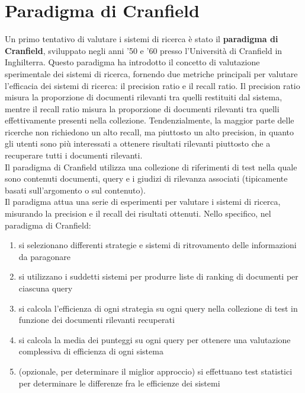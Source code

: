 \documentclass{report}
\begin{document}
	\section{Paradigma di Cranfield}
	Un primo tentativo di valutare i sistemi di ricerca è stato il \textbf{paradigma di Cranfield}, sviluppato negli anni '50 e '60 presso l'Università di Cranfield in Inghilterra. Questo paradigma ha introdotto il concetto di valutazione sperimentale dei sistemi di ricerca, fornendo due metriche principali per valutare l'efficacia dei sistemi di ricerca: il precision ratio e il recall ratio. Il precision ratio misura la proporzione di documenti rilevanti tra quelli restituiti dal sistema, mentre il recall ratio misura la proporzione di documenti rilevanti tra quelli effettivamente presenti nella collezione. Tendenzialmente, la maggior parte delle ricerche non richiedono un alto recall, ma piuttosto un alto precision, in quanto gli utenti sono più interessati a ottenere risultati rilevanti piuttosto che a recuperare tutti i documenti rilevanti. 
	\vspace{\baselineskip}\\
	Il paradigma di Cranfield utilizza una collezione di riferimenti di test nella quale sono contenuti documenti, query e i giudizi di rilevanza associati (tipicamente basati sull'argomento o sul contenuto).
	\vspace{\baselineskip}\\
	Il paradigma attua una serie di esperimenti per valutare i sistemi di ricerca, misurando la precision e il recall dei risultati ottenuti. Nello specifico, nel paradigma di Cranfield:
	\begin{enumerate}
		\item si selezionano differenti strategie e sistemi di ritrovamento delle informazioni da paragonare
		\item si utilizzano i suddetti sistemi per produrre liste di ranking di documenti per ciascuna query
		\item si calcola l'efficienza di ogni strategia su ogni query nella collezione di test in funzione dei documenti rilevanti recuperati
		\item si calcola la media dei punteggi su ogni query per ottenere una valutazione complessiva di efficienza di ogni sistema
		\item (opzionale, per determinare il miglior approccio) si effettuano test statistici per determinare le differenze fra le efficienze dei sistemi
	\end{enumerate}
\end{document}
